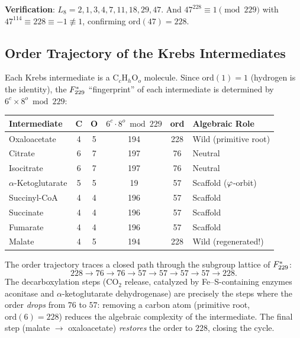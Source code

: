 \noindent\textbf{Verification}: $L_8 = 2, 1, 3, 4, 7, 11, 18, 29, 47$. And $47^{228} \equiv 1 \pmod{229}$ with $47^{114} \equiv 228 \equiv -1 \not\equiv 1$, confirming $\mathrm{ord}(47) = 228$.

\subsection{Order Trajectory of the Krebs Intermediates}

Each Krebs intermediate is a C$_c$H$_h$O$_o$ molecule. Since $\mathrm{ord}(1) = 1$ (hydrogen is the identity), the $F_{229}^*$ ``fingerprint'' of each intermediate is determined by $6^c \times 8^o \bmod 229$:

\begin{center}
\begin{tabular}{@{}lcc|cc|l@{}}
\toprule
\textbf{Intermediate} & C & O & $6^c \cdot 8^o \bmod 229$ & \textbf{ord} & \textbf{Algebraic Role} \\
\midrule
Oxaloacetate & 4 & 5 & 194 & 228 & Wild (primitive root) \\
Citrate      & 6 & 7 & 197 & 76  & Neutral \\
Isocitrate   & 6 & 7 & 197 & 76  & Neutral \\
$\alpha$-Ketoglutarate & 5 & 5 & 19 & 57 & Scaffold ($\varphi$-orbit) \\
Succinyl-CoA & 4 & 4 & 196 & 57  & Scaffold \\
Succinate    & 4 & 4 & 196 & 57  & Scaffold \\
Fumarate     & 4 & 4 & 196 & 57  & Scaffold \\
Malate       & 4 & 5 & 194 & 228 & Wild (regenerated!) \\
\bottomrule
\end{tabular}
\end{center}

\noindent The order trajectory traces a closed path through the subgroup lattice of $F_{229}^*$:
\[
228 \to 76 \to 76 \to 57 \to 57 \to 57 \to 57 \to 228.
\]
The decarboxylation steps (CO$_2$ release, catalyzed by Fe--S-containing enzymes aconitase and $\alpha$-ketoglutarate dehydrogenase) are precisely the steps where the order \emph{drops} from $76$ to $57$: removing a carbon atom (primitive root, $\mathrm{ord}(6) = 228$) reduces the algebraic complexity of the intermediate. The final step (malate $\to$ oxaloacetate) \emph{restores} the order to $228$, closing the cycle.

